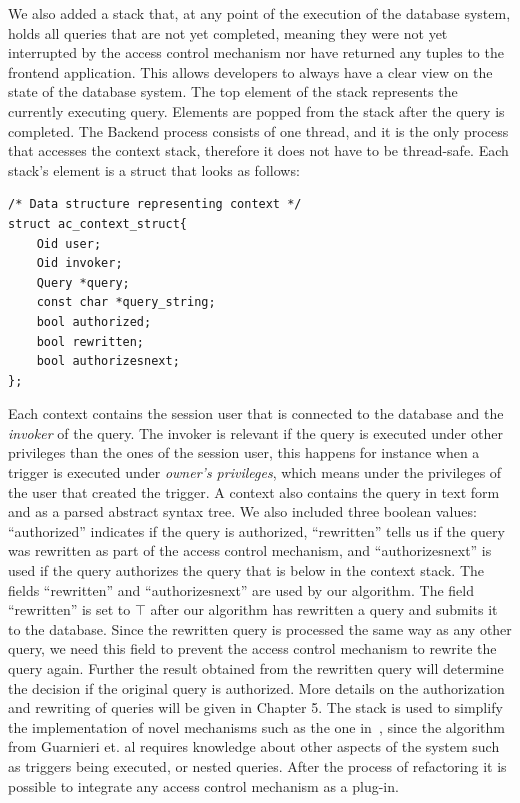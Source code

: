 We also added a stack that, at any point of the execution of the database system, holds all queries that are not yet completed, meaning they were not yet interrupted by the access control mechanism nor have returned any tuples to the frontend application. 
%
This allows developers to always have a clear view on the state of the database system.
%
The top element of the stack represents the currently executing query.
%
Elements are popped from the stack after the query is completed.
%
The Backend process consists of one thread, and it is the only process that accesses the context stack, therefore it does not have to be thread-safe. 
% 
Each stack's element is a struct that looks as follows:
%
\begin{lstlisting}[frame=single, style=customc]
/* Data structure representing context */
struct ac_context_struct{
	Oid user;
	Oid invoker;
	Query *query;
	const char *query_string;
	bool authorized;
	bool rewritten;
	bool authorizesnext;
};
\end{lstlisting}
%
Each context contains the session user that is connected to the database and the \emph{invoker} of the query.
%
The invoker is relevant if the query is executed under other privileges than the ones of the session user, this happens for instance when a trigger is executed under \emph{owner's privileges}, which means under the privileges of the user that created the trigger.
%
A context also contains the query in text form and as a parsed abstract syntax tree.
%
We also included three boolean values: ``authorized'' indicates if the query is authorized, ``rewritten'' tells us if the query was rewritten as part of the access control mechanism, and ``authorizesnext'' is used if the query authorizes the query that is below in the context stack. 
%
The fields ``rewritten'' and ``authorizesnext'' are used by our algorithm.
%
The field ``rewritten'' is set to $\top$ after our algorithm has rewritten a query and submits it to the database. 
%
Since the rewritten query is processed the same way as any other query, we need this field to prevent the access control mechanism to rewrite the query again.
%
Further the result obtained from the rewritten query will determine the decision if the original query is authorized.
%
More details on the authorization and rewriting of queries will be given in Chapter 5.
%
The stack is used to simplify the implementation of novel mechanisms such as the one in~\cite{guarnieri2016strong}, since the algorithm from Guarnieri et. al requires knowledge about other aspects of the system such as triggers being executed, or nested queries.
%
After the process of refactoring it is possible to integrate any access control mechanism as a plug-in.